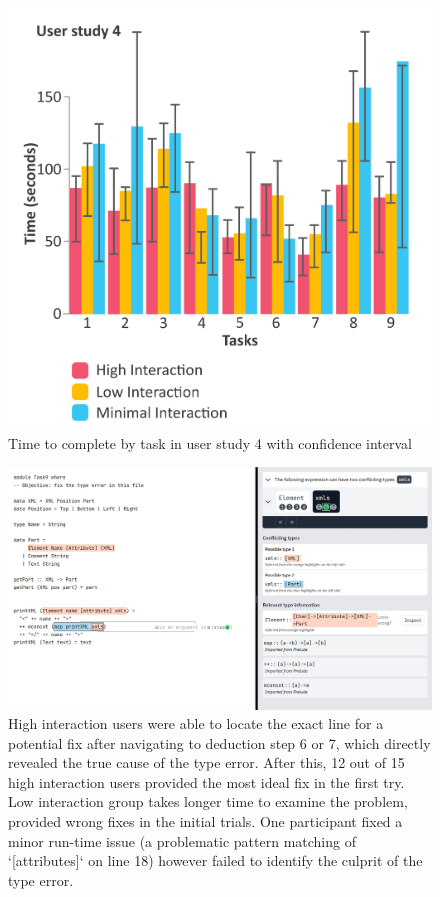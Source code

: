 \begin{figure}[h]
    \centering
    \includegraphics[width=\linewidth]{images/r4-analysis.pdf}
    \caption{Time to complete by task in user study 4 with confidence interval}
    \label{fig:r4-analysis}
\end{figure}


\begin{figure}[h]
    \centering
    \includegraphics[width=\linewidth]{images/r4-task9.png}
    \caption{
High interaction users were able to locate the exact line for a potential fix after navigating to deduction step 6 or 7, which directly revealed the true cause of the type error. After this, 12 out of 15 high interaction users provided the most ideal fix in the first try. Low interaction group  takes longer time to examine the problem, provided wrong fixes in the initial trials. One participant fixed a minor run-time issue (a problematic pattern matching of `[attributes]` on line 18) however failed to identify the culprit of the type error.
    }
    \label{fig:r4-task9}
\end{figure}


